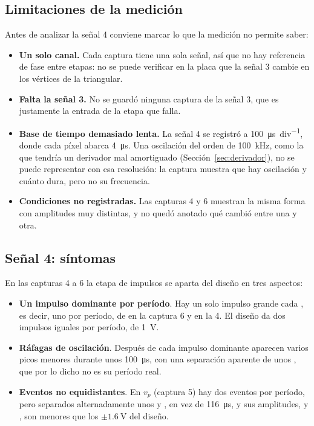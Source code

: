 \subsection{Limitaciones de la medición}
Antes de analizar la señal 4 conviene marcar lo que la medición no permite saber:
\begin{itemize}[leftmargin=*, nosep]
    \item \textbf{Un solo canal.} Cada captura tiene una sola señal, así que no hay referencia de fase entre etapas: no se puede verificar en la placa que la señal 3 cambie en los vértices de la triangular.
    \item \textbf{Falta la señal 3.} No se guardó ninguna captura de la señal 3, que es justamente la entrada de la etapa que falla.
    \item \textbf{Base de tiempo demasiado lenta.} La señal 4 se registró a \SI{100}{\micro\second\per div}, donde cada píxel abarca \SI{4}{\micro\second}. Una oscilación del orden de \SI{100}{\kilo\hertz}, como la que tendría un derivador mal amortiguado (Sección~\ref{sec:derivador}), no se puede representar con esa resolución: la captura muestra que hay oscilación y cuánto dura, pero no su frecuencia.
    \item \textbf{Condiciones no registradas.} Las capturas 4 y 6 muestran la misma forma con amplitudes muy distintas, y no quedó anotado qué cambió entre una y otra.
\end{itemize}

\subsection{Señal 4: síntomas}
En las capturas 4 a 6 la etapa de impulsos se aparta del diseño en tres aspectos:
\begin{itemize}[leftmargin=*, nosep]
    \item \textbf{Un impulso dominante por período}. Hay un solo impulso grande cada , es decir, uno por período, de  en la captura 6 y  en la 4. El diseño da dos impulsos iguales por período, de \SI{1}{\volt}.
    \item \textbf{Ráfagas de oscilación}. Después de cada impulso dominante aparecen varios picos menores durante unos \SI{100}{\micro\second}, con una separación aparente de unos , que por lo dicho no es su período real.
    \item \textbf{Eventos no equidistantes}. En $v_p$ (captura 5) hay dos eventos por período, pero separados alternadamente unos  y , en vez de \SI{116}{\micro\second}, y sus amplitudes,  y , son menores que los $\pm\SI{1,6}{\volt}$ del diseño.
\end{itemize}


